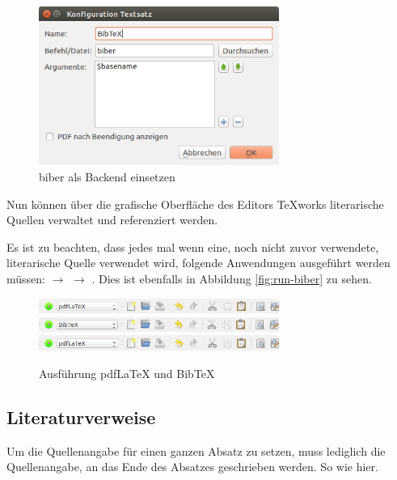 \begin{figure}
	\centering
	\includegraphics[width=0.7\textwidth]{bilder/konfiguration-biber-02.png}
	\caption{biber als Backend einsetzen}
	\label{fig:konfiguration-biber-02}
\end{figure}

Nun können über die grafische Oberfläche des Editors TeXworks literarische Quellen verwaltet und referenziert werden.

Es ist zu beachten, dass jedes mal wenn eine, noch nicht zuvor verwendete, literarische Quelle verwendet wird, folgende Anwendungen ausgeführt werden müssen:  $\rightarrow$  $\rightarrow$ . Dies ist ebenfalls in Abbildung \vref{fig:run-biber} zu sehen.

\begin{figure}
	\centering
	\includegraphics[width=0.7\textwidth]{bilder/run-biber-01.png}
	\includegraphics[width=0.7\textwidth]{bilder/run-biber-02.png}
	\includegraphics[width=0.7\textwidth]{bilder/run-biber-01.png}
	\caption{Ausführung pdfLaTeX und BibTeX}
	\label{fig:run-biber}
\end{figure}


\subsection{Literaturverweise}

Um die Quellenangabe für einen ganzen Absatz zu setzen, muss lediglich die Quellenangabe, an das Ende des Absatzes geschrieben werden. So wie hier.\\
\parencite[3-5]{angenendt}

